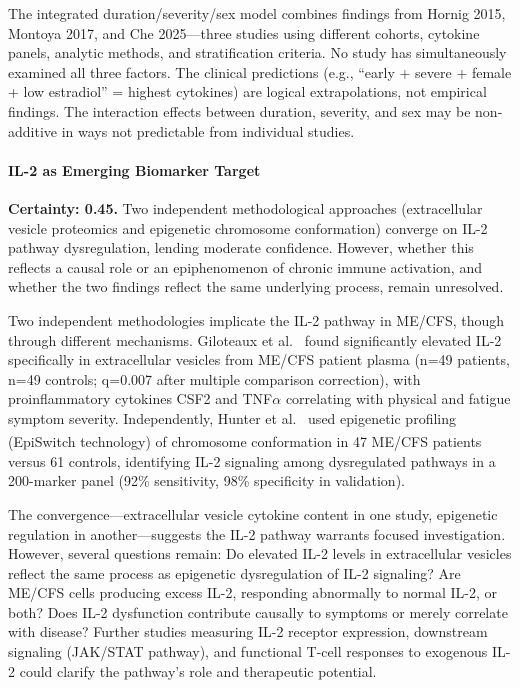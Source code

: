 \begin{limitation}
The integrated duration/severity/sex model combines findings from Hornig 2015, Montoya 2017, and Che 2025---three studies using different cohorts, cytokine panels, analytic methods, and stratification criteria. No study has simultaneously examined all three factors. The clinical predictions (e.g., ``early + severe + female + low estradiol'' = highest cytokines) are logical extrapolations, not empirical findings. The interaction effects between duration, severity, and sex may be non-additive in ways not predictable from individual studies.
\end{limitation}

\paragraph{IL-2 as Emerging Biomarker Target}

\begin{hypothesis}
\label{hyp:il2-pathway}

\textbf{Certainty: 0.45.} Two independent methodological approaches (extracellular vesicle proteomics and epigenetic chromosome conformation) converge on IL-2 pathway dysregulation, lending moderate confidence. However, whether this reflects a causal role or an epiphenomenon of chronic immune activation, and whether the two findings reflect the same underlying process, remain unresolved.

Two independent methodologies implicate the IL-2 pathway in ME/CFS, though through different mechanisms. Giloteaux et al.~\cite{Giloteaux2023} found significantly elevated IL-2 specifically in extracellular vesicles from ME/CFS patient plasma (n=49 patients, n=49 controls; q=0.007 after multiple comparison correction), with proinflammatory cytokines CSF2 and TNF$\alpha$ correlating with physical and fatigue symptom severity. Independently, Hunter et al.~\cite{Hunter2025} used epigenetic profiling (EpiSwitch\textsuperscript{\textregistered} technology) of chromosome conformation in 47 ME/CFS patients versus 61 controls, identifying IL-2 signaling among dysregulated pathways in a 200-marker panel (92\% sensitivity, 98\% specificity in validation).

The convergence---extracellular vesicle cytokine content in one study, epigenetic regulation in another---suggests the IL-2 pathway warrants focused investigation. However, several questions remain: Do elevated IL-2 levels in extracellular vesicles reflect the same process as epigenetic dysregulation of IL-2 signaling? Are ME/CFS cells producing excess IL-2, responding abnormally to normal IL-2, or both? Does IL-2 dysfunction contribute causally to symptoms or merely correlate with disease? Further studies measuring IL-2 receptor expression, downstream signaling (JAK/STAT pathway), and functional T-cell responses to exogenous IL-2 could clarify the pathway's role and therapeutic potential.
\end{hypothesis}

